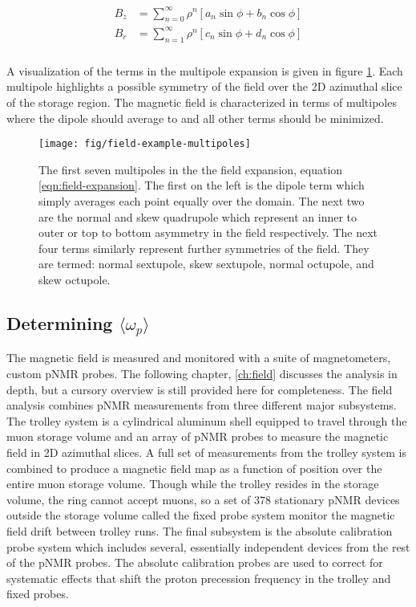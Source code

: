 \begin{align}
\label{eqn:field-expansion}
\begin{split}
B_z & = \sum_{n=0}^{\infty} \rho^n[a_n \sin{\phi} + b_n \cos{\phi}] \\
B_r & = \sum_{n=1}^{\infty} \rho^n[c_n \sin{\phi} + d_n \cos{\phi}] \\
\end{split}
\end{align}

\noindent
A visualization of the terms in the multipole expansion is given in figure \ref{fig:field-example-multipoles}.  Each multipole highlights a possible symmetry of the field over the 2D azimuthal slice of the storage region. The magnetic field is characterized in terms of multipoles where the dipole should average to \bmagic and all other terms should be minimized.

\begin{figure}
\texttt{[image: fig/field-example-multipoles]}
\caption{The first seven multipoles in the the field expansion, equation \ref{eqn:field-expansion}.  The first on the left is the dipole term which simply averages each point equally over the domain.  The next two are the normal and skew quadrupole which represent an inner to outer or top to bottom asymmetry in the field respectively.  The next four terms similarly represent further symmetries of the field.  They are termed: normal sextupole, skew sextupole, normal octupole, and skew octupole. \label{fig:field-example-multipoles}}
\end{figure}

\subsection{Determining $\langle \omega_p \rangle$}

The magnetic field is measured and monitored with a suite of magnetometers, custom pNMR probes. The following chapter, \ref{ch:field} discusses the analysis in depth, but a cursory overview is still provided here for completeness.  The field analysis combines pNMR measurements from three different major subsystems.  The trolley system is a cylindrical aluminum shell equipped to travel through the muon storage volume and an array of pNMR probes to measure the magnetic field in 2D azimuthal slices.  A full set of measurements from the trolley system is combined to produce a magnetic field map as a function of position over the entire muon storage volume.  Though while the trolley resides in the storage volume, the ring cannot accept muons, so a set of 378 stationary pNMR devices outside the storage volume called the fixed probe system monitor the magnetic field drift between trolley runs.  The final subsystem is the absolute calibration probe system which includes several, essentially independent devices from the rest of the pNMR probes.  The absolute calibration probes are used to correct for systematic effects that shift the proton precession frequency in the trolley and fixed probes.


